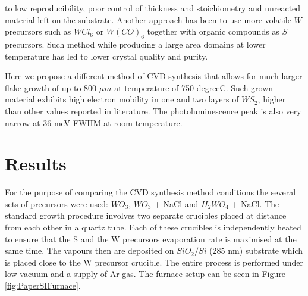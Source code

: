 to low reproducibility, poor control of thickness and stoichiometry and unreacted material left on the substrate. Another approach has been to use more volatile $W$ precursors such as $WCl_6$\cite{Carmalt2003} or $W(CO)_6$\cite{Kang2015}\cite{Eichfeld2015} together with organic compounds as $S$ precursors. Such method while producing a large area domains at lower temperature has led to lower crystal quality and purity.

Here we propose a different method of CVD synthesis that allows for much larger flake growth of up to 800 $\mu m$ at temperature of 750 {degree}C. Such grown material exhibits high electron mobility in one and two layers of $WS_2$, higher than other values reported in literature. The photoluminescence peak is also very narrow at 36 meV FWHM at room temperature. 

\section{Results}
	
For the purpose of comparing the CVD synthesis method conditions the several sets of precursors were used: $WO_3$, $WO_3$ + NaCl and $H_2WO_4$ + NaCl. The standard growth procedure involves two separate crucibles placed at distance from each other in a quartz tube. Each of these crucibles is independently heated to ensure that the S and the W precursors evaporation rate is maximised at the same time. The vapours then are deposited on $SiO_2/Si$ (285 nm) substrate which is placed close to the W precursor crucible. The entire process is performed under low vacuum and a supply of Ar gas. The furnace setup can be seen in Figure \ref{fig:PaperSIFurnace}.

